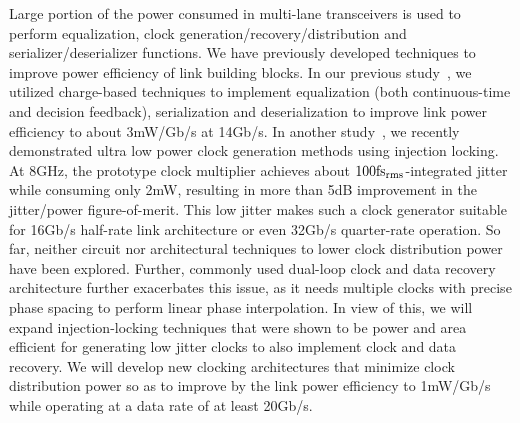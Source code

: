 Large portion of the power consumed in multi-lane transceivers is used to perform equalization, clock generation/recovery/distribution and serializer/deserializer functions. 
We have previously developed techniques to improve power efficiency of link building blocks.
In our previous study~\cite{saxena20152}, we utilized charge-based techniques to implement equalization (both continuous-time and decision feedback), serialization and deserialization to improve link power efficiency to about 3mW/Gb/s at 14Gb/s. 
In another study~\cite{elkholy201610}, we recently demonstrated ultra low power clock generation methods using injection locking. 
At 8GHz, the prototype clock multiplier achieves about $\rm 100 fs_{rms}$-integrated jitter while consuming only 2mW, resulting in more than 5dB improvement in the jitter/power figure-of-merit. 
This low jitter makes such a clock generator suitable for 16Gb/s half-rate link architecture or even 32Gb/s quarter-rate operation. 
So far, neither circuit nor architectural techniques to lower clock distribution power have been explored. 
Further, commonly used dual-loop clock and data recovery  architecture further exacerbates this issue, as it needs multiple clocks with precise phase spacing to perform linear phase interpolation. 
In view of this, we will expand injection-locking techniques that were shown to be power and area efficient for generating low jitter clocks to also implement clock and data recovery. 
We will develop new clocking architectures that minimize clock distribution power so as to improve by the link power efficiency to 1mW/Gb/s while operating at a data rate of at least 20Gb/s.

